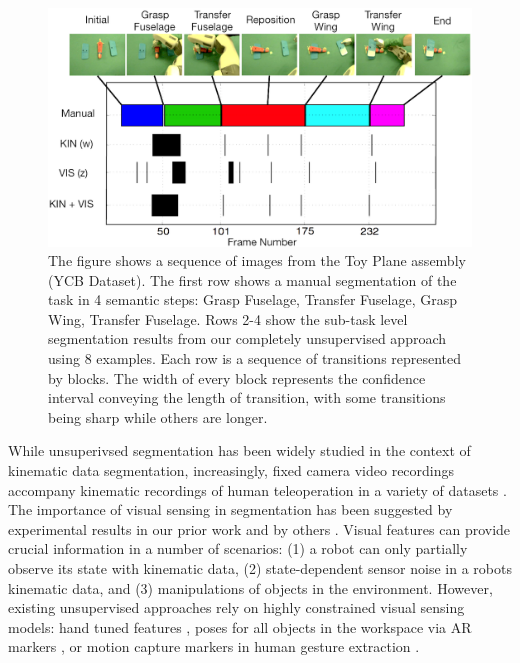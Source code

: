 \begin{figure}[ht]
\centering
\includegraphics[width=\linewidth]{figures/pr2_plane_assembly.png}
\caption{The figure shows a sequence of images from the Toy Plane assembly (YCB Dataset). The first row shows a manual segmentation of the task in 4 semantic steps: Grasp Fuselage, Transfer Fuselage, Grasp Wing, Transfer Fuselage. Rows 2-4 show the sub-task level segmentation results from our completely unsupervised approach using 8 examples. Each row is a sequence of transitions represented by blocks. The width of every block represents the confidence interval conveying the length of transition, with some transitions being sharp while others are longer.}
 \label{fig:pr2_toyplane}
\vspace{-10pt} 
\end{figure}

While unsuperivsed segmentation has been widely studied in the context of kinematic data segmentation, increasingly, fixed camera video recordings accompany kinematic recordings of human teleoperation in a variety of datasets \cite{hodgins2009guide, gao2014jigsaws, ofli2013berkeley}.
The importance of visual sensing in segmentation has been suggested by experimental results in our prior work \cite{krishnan2015tsc} and by others \cite{Niekum2015learning}.
Visual features can provide crucial information in a number of scenarios: (1) a robot can only partially observe its state with kinematic data, (2) state-dependent sensor noise in a robots kinematic data, and (3) manipulations of objects in the environment.
However, existing unsupervised approaches rely on highly constrained visual sensing models: hand tuned features \cite{krishnan2015tsc}, poses for all objects in the workspace via AR markers \cite{Niekum2015learning}, or motion capture markers in human gesture extraction \cite{kulic2011incremental}.

